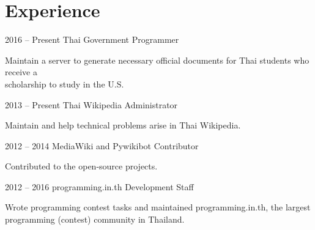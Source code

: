 \documentclass{tccv}
\begin{document}
\section{Experience}

\begin{eventlist}

\item{2016 -- Present}
     {Thai Government}
		 {Programmer}
		 
Maintain a server to generate necessary official documents for Thai students who receive a \\scholarship to study in the U.S.

\item{2013 -- Present}
{Thai Wikipedia}
{Administrator}

Maintain and help technical problems arise in Thai Wikipedia.

\item{2012 -- 2014}
     {MediaWiki and Pywikibot}
     {Contributor}
     
Contributed to the open-source projects.

\item{2012 -- 2016}
     {programming.in.th}
     {Development Staff}

Wrote programming contest tasks and maintained  programming.in.th, the largest programming \newline (contest) community in Thailand.

%  

\end{eventlist}


%
\end{document}
